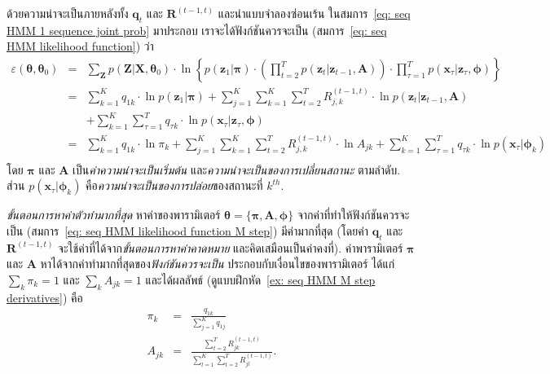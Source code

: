 ด้วยความน่าจะเป็นภายหลังทั้ง $\bm{q}_t$ และ $\bm{R}^{(t-1,t)}$
และนำแบบจำลองซ่อนเร้น ในสมการ~\ref{eq: seq HMM 1 sequence joint prob} มาประกอบ
เราจะได้ฟังก์ชันควรจะเป็น (สมการ~\ref{eq: seq HMM likelihood function}) ว่า
\begin{eqnarray}
\varepsilon (\bm{\theta}, \bm{\theta}_0)
&=&
\sum_{\bm{Z}} p(\bm{Z}|\bm{X}, \bm{\theta}_0) \cdot
\ln \left\{p(\bm{z}_1|\bm{\pi}) \cdot \left( \prod_{t=2}^T p(\bm{z}_t|\bm{z}_{t-1}, \bm{A}) \right)
\cdot \prod_{\tau=1}^T p(\bm{x}_\tau|\bm{z}_\tau, \bm{\phi}) \right\}
\nonumber \\
&=&
\sum_{k=1}^K q_{1k} \cdot \ln p(\bm{z}_1|\bm{\pi}) +  \sum_{j=1}^K \sum_{k=1}^K \sum_{t=2}^T R^{(t-1,t)}_{j,k} \cdot \ln p(\bm{z}_t|\bm{z}_{t-1}, \bm{A})
\nonumber\\
&\;&
+  \sum_{k=1}^K \sum_{\tau=1}^T q_{\tau k} \cdot \ln p(\bm{x}_\tau|\bm{z}_\tau, \bm{\phi})
\nonumber \\
&=&
\sum_{k=1}^K q_{1k} \cdot \ln \pi_k +  \sum_{j=1}^K \sum_{k=1}^K \sum_{t=2}^T R^{(t-1,t)}_{j,k} \cdot \ln A_{jk}
+  \sum_{k=1}^K \sum_{\tau=1}^T q_{\tau k} \cdot \ln p(\bm{x}_\tau|\bm{\phi}_k)
\nonumber \\
\label{eq: seq HMM likelihood function M step}
\end{eqnarray}
โดย $\bm{\pi}$ และ %
$\bm{A}$ %
เป็น\textit{ค่าความน่าจะเป็นเริ่มต้น}
และ\textit{ความน่าจะเป็นของการเปลี่ยนสถานะ} ตามลำดับ.
ส่วน $p(\bm{x}_\tau|\bm{\phi}_k)$ คือ\textit{ความน่าจะเป็นของการปล่อย}ของสถานะที่ $k^{th}$.

\textit{ขั้นตอนการหาค่าตัวทำมากที่สุด} 
หาค่าของพารามิเตอร์ $\bm{\theta} =\{\bm{\pi}, \bm{A}, \bm{\phi} \}$ จากค่าที่ทำให้ฟังก์ชันควรจะเป็น (สมการ~\ref{eq: seq HMM likelihood function M step})
มีค่ามากที่สุด (โดยค่า $\bm{q}_t$ และ $\bm{R}^{(t-1,t)}$ จะใช้ค่าที่ได้จาก\textit{ขั้นตอนการหาค่าคาดหมาย} และคิดเสมือนเป็นค่าคงที่).
ค่าพารามิเตอร์ $\bm{\pi}$ และ $\bm{A}$ หาได้จากค่าทำมากที่สุดของ\textit{ฟังก์ชันควรจะเป็น} ประกอบกับเงื่อนไขของพารามิเตอร์
ได้แก่ $\sum_k \pi_k = 1$ และ $\sum_k A_{jk} = 1$ และได้ผลลัพธ์ (ดูแบบฝึกหัด~\ref{ex: seq HMM M step derivatives}) คือ
%
\begin{eqnarray}
\pi_k &=& \frac{q_{1k}}{\sum_{j=1}^K q_{1j}}
\label{eq: seq HMM pi_k} \\
A_{jk} &=& \frac{\sum_{t=2}^T R^{(t-1,t)}_{jk} }{ \sum_{l=1}^K \sum_{t=2}^T R^{(t-1,t)}_{jl} }
\label{eq: seq HMM A_jk} .
\end{eqnarray}


